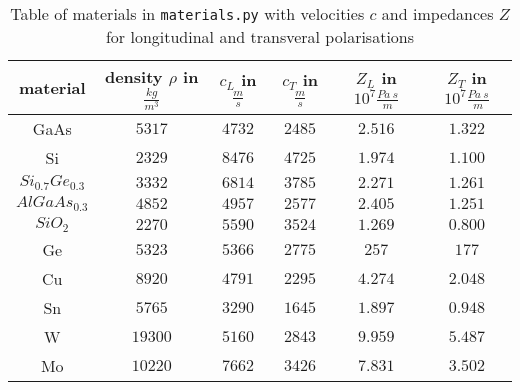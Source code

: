 \begin{table}[h]
    \centering
    \begin{tabular}{c|c|c|c|c|c}
        material & density $\rho$ in $\si{\frac{kg}{m^3}}$   & $c_L$ in $\si{\frac{m}{s}}$  
        &   $c_T$ in $\si{\frac{m}{s}}$   &   $Z_L$ in $10^7\si{\frac{Pa\ s}{m}}$     &   	$Z_T$  in $10^7\si{\frac{Pa\ s}{m}}$ \\ \hline
    GaAs \cite{matprop}
    &       $5317$        &       $4732$        &
        $2485$        &       $2.516 $     &       $1.322 $ \\
    Si \cite{matprop}
      &       $2329$        &       $8476 $        &
        $4725$        &       $1.974 $     &       $1.100 $ \\
    $\si{Si_{0.7}Ge_{0.3}} $\cite{matprop}    &       $3332$        &       $6814$
            &       $3785$        &       $2.271 $     &       $1.261 $ \\
    $\si{AlGaAs_{0.3} }$ \cite{matprop} &       $4852 $        &       $4957 $
            &       $2577 $        &       $2.405 $     &
                $1.251 $ \\ 
    $\si{SiO_2}$\cite{Kareh1995} &       $2270 $        &       $5590 $        &
        $3524 $        &       $1.269 $     &       $0.800 $ \\ 
    Ge \cite{matprop}  &       $5323 $        &       $5366 $        &
        $2775 $        &       $2 57 $     &       $1 77 $ \\
    Cu  \cite{azom}    &       $8920 $        &       $4791 $        &
        $2295 $        &       $4.274 $     &       $2.048 $ \\
    Sn \cite{azom}      &       $5765 $        &       $3290 $        &
        $1645 $        &       $1.897 $     &       $0.948$ \\
    W   \cite{azom}     &       $19300 $       &       $5160 $        &
        $2843 $        &       $9.959 $     &       $5.487 $ \\
    Mo \cite{azom}      &       $10220 $       &       $7662 $        &
        $3426 $        &       $7.831 $     &       $3.502 $ \\
    \end{tabular}
    \caption{Table of materials in \texttt{materials.py} with 
    velocities $c$ and impedances $Z$ for longitudinal and transveral polarisations}
    \label{tab:materials}
\end{table}
